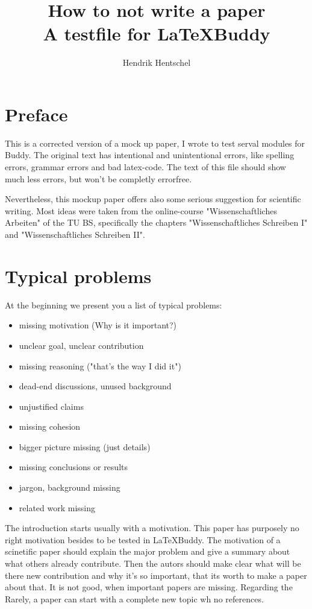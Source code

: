 \documentclass[12pt,a4paper]{article}
\begin{document}
\title{\Large \bf How to not write a paper\\ \Large A testfile for \LaTeX{}Buddy}
\author{Hendrik Hentschel}
\maketitle %
\section*{Preface}
This is a corrected version of a mock up paper, I wrote to test serval modules for \Latex{}Buddy. The original text has intentional and unintentional errors, like spelling errors, grammar errors and bad latex-code. The text of this file should show much less errors, but won't be completly errorfree.

Nevertheless, this mockup paper offers also some serious suggestion for scientific writing. Most ideas were taken from the online-course "Wissenschaftliches Arbeiten" of the TU BS, specifically the chapters "Wissenschaftliches Schreiben I" and "Wissenschaftliches Schreiben II".

\section{Typical problems}
At the beginning we present you a list of typical problems:
\begin{itemize}
    \item missing motivation (Why is it important?)
    \item unclear goal, unclear contribution
    \item missing reasoning ("that's the way I did it")
    \item dead-end discussions, unused background
    \item unjustified claims
    \item missing cohesion
    \item bigger picture missing (just details)
    \item missing conclusions or results
    \item jargon, background missing
    \item related work missing
\end{itemize}

The introduction starts usually with a motivation. This paper has purposely no right motivation besides to be tested in \LaTeX{}Buddy. The motivation of a scinetific paper should explain the major problem and give a summary about what others already contribute. Then the autors should make clear what will be there new contribution and why it's so important, that its worth to make a paper about that.
It is not good, when important papers are missing. Regarding the Rarely, a paper can start with a complete new topic wh no references.
\end{document}
